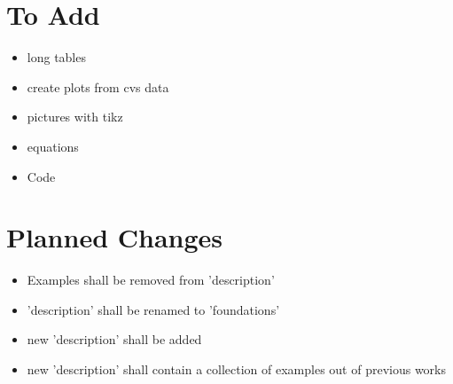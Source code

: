 \section{To Add}

\begin{itemize}
    \item long tables
    \item create plots from cvs data
    \item pictures with tikz
    \item equations
    \item Code
\end{itemize}

\section{Planned Changes}

\begin{itemize}
    \item Examples shall be removed from 'description'
    \item 'description' shall be renamed to 'foundations'
    \item new 'description' shall be added
    \item new 'description' shall contain a collection of examples out of previous works
\end{itemize}